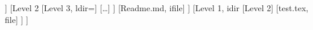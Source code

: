 \documentclass{article}
\begin{document}
\begin{fancydir}
    [Toplevel
        [Level 1, dir=green!80!black
            [Level 2
                [Level 3]
                [Another file, cfile={magenta}{X}]
            ]
            [Level 2
                [Level 3, ldir={\faApple}]
                [\ldots]
            ]
            [Readme.md, ifile]
        ]
        [Level 1, idir
            [Level 2]
            [test.tex, file]
        ]
    ]
    \end{fancydir}
\end{document}
